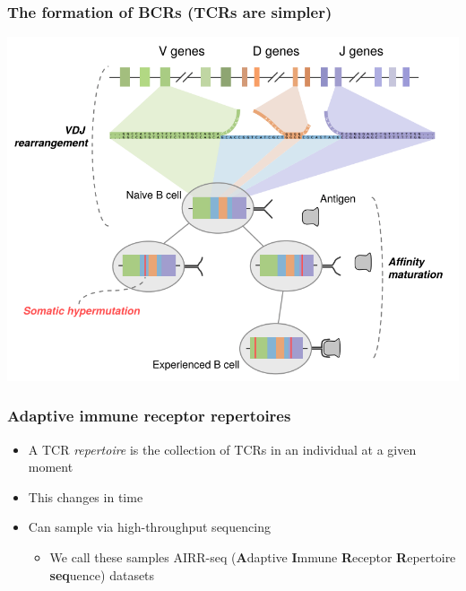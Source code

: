 \documentclass[mathserif,compress,xcolor={dvipsnames}]{beamer}
\renewcommand\;{\,}
\begin{document}
\begin{frame}\frametitle{The formation of BCRs (TCRs are simpler)}
\begin{center}
\includegraphics[width=\linewidth]{Images/BCRFormation.png}
\end{center}
\end{frame}

\begin{frame}\frametitle{Adaptive immune receptor repertoires}
\begin{itemize}
\item[]
A TCR \emph{repertoire} is the collection of TCRs in an individual at a given moment
\bigskip
\item[]
This changes in time
\bigskip
\item[]
Can sample via high-throughput sequencing
\medskip
\begin{itemize}
\item
We call these samples AIRR-seq (\textbf{A}daptive \textbf{I}mmune \textbf{R}eceptor \textbf{R}epertoire \textbf{seq}uence) datasets
\end{itemize}
\end{itemize}
\end{frame}
\end{document}
